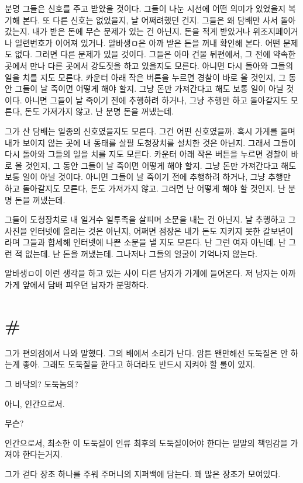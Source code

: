 \documentclass[a5paper,10pt, twoside, openright]{memoir}
\begin{document}
	분명 그들은 신호를 주고 받았을 것이다. 그들이 나눈 시선에 어떤 의미가 있었을지 복기해 본다. 또 다른 신호는 없었을지, 날 어쩌려했던 건지. 그들은 왜 담배만 사서 돌아갔는지. 내가 받은 돈에 무슨 문제가 있는 건 아닌지. 돈을 적게 받았거나 위조지폐이거나 일련번호가 이어져 있거나. 알바생ㅁ은 아까 받은 돈을 꺼내 확인해 본다. 어떤 문제도 없다. 그러면 다른 문제가 있을 것이다. 그들은 아마 건물 뒤편에서, 그 전에 약속한 곳에서 만나 다른 곳에서 강도짓을 하고 있을지도 모른다. 아니면 다시 돌아와 그들의 일을 치를 지도 모른다. 카운터 아래 작은 버튼을 누르면 경찰이 바로 올 것인지, 그 동안 그들이 날 죽이면 어떻게 해야 할지. 그냥 돈만 가져간다고 해도 보통 일이 아닐 것이다. 아니면 그들이 날 죽이기 전에 추행하려 하거나, 그냥 추행만 하고 돌아갈지도 모른다, 돈도 가져가지 않고. 난 분명 돈을 꺼냈는데.

	그가 산 담배는 일종의 신호였을지도 모른다. 그건 어떤 신호였을까. 혹시 가게를 돌며 내가 보이지 않는 곳에 내 동태를 살필 도청장치를 설치한 것은 아닌지. 그래서 그들이 다시 돌아와 그들의 일을 치를 지도 모른다. 카운터 아래 작은 버튼을 누르면 경찰이 바로 올 것인지, 그 동안 그들이 날 죽이면 어떻게 해야 할지. 그냥 돈만 가져간다고 해도 보통 일이 아닐 것이다. 아니면 그들이 날 죽이기 전에 추행하려 하거나, 그냥 추행만 하고 돌아갈지도 모른다, 돈도 가져가지 않고. 그러면 난 어떻게 해야 할 것인지. 난 분명 돈을 꺼냈는데.

	그들이 도청장치로 내 일거수 일투족을 살피며 소문을 내는 건 아닌지. 날 추행하고 그 사진을 인터넷에 올리는 것은 아닌지, 어쩌면 점장은 내가 돈도 지키지 못한 갈보년이라며 그들과 합세해 인터넷에 나쁜 소문을 낼 지도 모른다. 난 그런 여자 아닌데. 난 그런 적 없는데. 난 돈을 꺼냈는데. 그나저나 그들의 얼굴이 기억나지 않는다. 

	알바생ㅁ이 이런 생각을 하고 있는 사이 다른 남자가 가게에 들어온다. 저 남자는 아까 가게 앞에서 담배 피우던 남자가 분명하다. 

	\section{\#}
	그가 편의점에서 나와 말했다. 그의 배에서 소리가 난다. 암튼 왠만해선 도둑질은 안 하는게 좋아. 그래도 도둑질을 한다고 하더라도 반드시 지켜야 할 룰이 있지.
	
	그 바닥의? 도둑놈의?
	
	아니, 인간으로서. 
	
	무슨? 
	
	인간으로서, 최소한 이 도둑질이 인류 최후의 도둑질이어야 한다는 일말의 책임감을 가져야 한다는거지. 

	그가 걷다 장초 하나를 주워 주머니의 지퍼백에 담는다. 꽤 많은 장초가 모여있다. 
\end{document}
